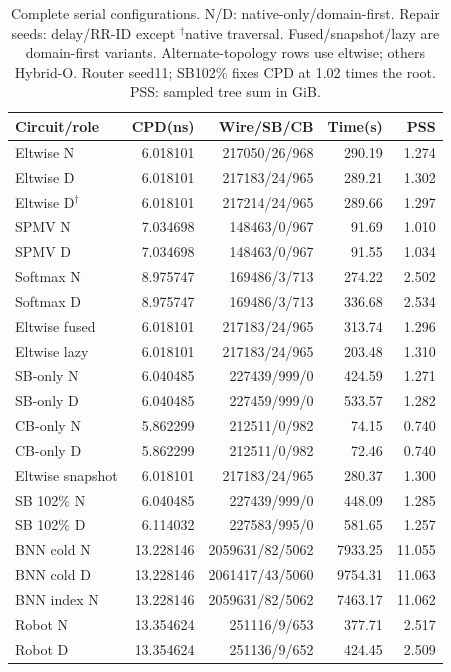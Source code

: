 \documentclass[conference,10pt]{IEEEtran}
\begin{document}
\begin{table}[t]
\centering\footnotesize\setlength{\tabcolsep}{3pt}
\caption{Complete serial configurations. N/D: native-only/domain-first. Repair seeds: delay/RR-ID except $^\dagger$native traversal. Fused/snapshot/lazy are domain-first variants. Alternate-topology rows use eltwise; others Hybrid-O. Router seed11; SB102\% fixes CPD at 1.02 times the root. PSS: sampled tree sum in GiB.}
\label{tab:completecost}
\begin{tabular}{lrrrr}\hline
Circuit/role & CPD(ns) & Wire/SB/CB & Time(s) & PSS\\\hline
Eltwise N&6.018101&217050/26/968&290.19&1.274\\
Eltwise D&6.018101&217183/24/965&289.21&1.302\\
Eltwise D$^\dagger$&6.018101&217214/24/965&289.66&1.297\\
SPMV N&7.034698&148463/0/967&91.69&1.010\\
SPMV D&7.034698&148463/0/967&91.55&1.034\\
Softmax N&8.975747&169486/3/713&274.22&2.502\\
Softmax D&8.975747&169486/3/713&336.68&2.534\\
Eltwise fused&6.018101&217183/24/965&313.74&1.296\\
Eltwise lazy&6.018101&217183/24/965&203.48&1.310\\
SB-only N&6.040485&227439/999/0&424.59&1.271\\
SB-only D&6.040485&227459/999/0&533.57&1.282\\
CB-only N&5.862299&212511/0/982&74.15&0.740\\
CB-only D&5.862299&212511/0/982&72.46&0.740\\
Eltwise snapshot&6.018101&217183/24/965&280.37&1.300\\
SB 102\% N&6.040485&227439/999/0&448.09&1.285\\
SB 102\% D&6.114032&227583/995/0&581.65&1.257\\
BNN cold N&13.228146&2059631/82/5062&7933.25&11.055\\
BNN cold D&13.228146&2061417/43/5060&9754.31&11.063\\
BNN index N&13.228146&2059631/82/5062&7463.17&11.062\\
Robot N&13.354624&251116/9/653&377.71&2.517\\
Robot D&13.354624&251136/9/652&424.45&2.509\\\hline
\end{tabular}
\end{table}
\end{document}
